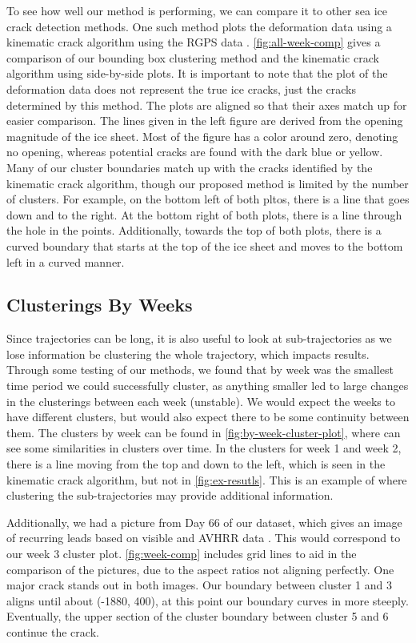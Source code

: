 \documentclass[12pt]{article}
\begin{document}
To see how well our method is performing, we can compare it to other sea
ice crack detection methods. One such method plots the deformation data
using a kinematic crack algorithm using the RGPS data
\citep{peterson_evaluating_2011}. \cref{fig:all-week-comp} gives a
comparison of our bounding box clustering method and the kinematic crack
algorithm using side-by-side plots. It is important to note that the
plot of the deformation data does not represent the true ice cracks,
just the cracks determined by this method. The plots are aligned so that
their axes match up for easier comparison. The lines given in the left
figure are derived from the opening magnitude of the ice sheet. Most of
the figure has a color around zero, denoting no opening, whereas
potential cracks are found with the dark blue or yellow. Many of our
cluster boundaries match up with the cracks identified by the kinematic
crack algorithm, though our proposed method is limited by the number of
clusters. For example, on the bottom left of both pltos, there is a line
that goes down and to the right. At the bottom right of both plots,
there is a line through the hole in the points. Additionally, towards
the top of both plots, there is a curved boundary that starts at the top
of the ice sheet and moves to the bottom left in a curved manner.

\hypertarget{clusterings-by-weeks}{%
\subsection{Clusterings By Weeks}\label{clusterings-by-weeks}}

Since trajectories can be long, it is also useful to look at
sub-trajectories as we lose information be clustering the whole
trajectory, which impacts results. Through some testing of our methods,
we found that by week was the smallest time period we could successfully
cluster, as anything smaller led to large changes in the clusterings
between each week (unstable). We would expect the weeks to have
different clusters, but would also expect there to be some continuity
between them. The clusters by week can be found in
\cref{fig:by-week-cluster-plot}, where can see some similarities in
clusters over time. In the clusters for week 1 and week 2, there is a
line moving from the top and down to the left, which is seen in the
kinematic crack algorithm, but not in \cref{fig:ex-resutls}. This is an
example of where clustering the sub-trajectories may provide additional
information.

Additionally, we had a picture from Day 66 of our dataset, which gives
an image of recurring leads based on visible and AVHRR data
\citep{eicken_sea_2015}. This would correspond to our week 3 cluster
plot. \cref{fig:week-comp} includes grid lines to aid in the comparison
of the pictures, due to the aspect ratios not aligning perfectly. One
major crack stands out in both images. Our boundary between cluster 1
and 3 aligns until about (-1880, 400), at this point our boundary curves
in more steeply. Eventually, the upper section of the cluster boundary
between cluster 5 and 6 continue the crack.
\end{document}
